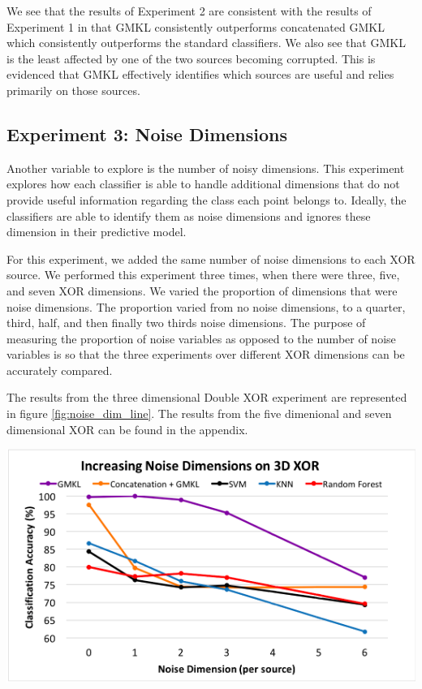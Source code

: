 \documentclass{article}
\begin{document}
We see that the results of Experiment 2 are consistent with the results of Experiment 1 in that GMKL consistently outperforms concatenated GMKL which consistently outperforms the standard classifiers. We also see that GMKL is the least affected by one of the two sources becoming corrupted. This is evidenced that GMKL effectively identifies which sources are useful and relies primarily on those sources.



\subsection*{Experiment 3: Noise Dimensions}

Another variable to explore is the number of noisy dimensions. This experiment explores how each classifier is able to handle additional dimensions that do not provide useful information regarding the class each point belongs to. Ideally, the classifiers are able to identify them as noise dimensions and ignores these dimension in their predictive model.

For this experiment, we added the same number of noise dimensions to each XOR source. We performed this experiment three times, when there were three, five, and seven XOR dimensions. We varied the proportion of dimensions that were noise dimensions. The proportion varied from no noise dimensions, to a quarter, third, half, and then finally two thirds noise dimensions. The purpose of measuring the proportion of noise variables as opposed to the number of noise variables is so that the three experiments over different XOR dimensions can be accurately compared.

The results from the three dimensional Double XOR experiment are represented in figure \ref{fig:noise_dim_line}. The results from the five dimenional and seven dimensional XOR can be found in the appendix.

\begin{minipage}{\textwidth}
    \centering
    \includegraphics[scale=0.7]{Noise_Dim_line.png}
    \label{fig:noise_dim_line}
\end{minipage}
\end{document}
